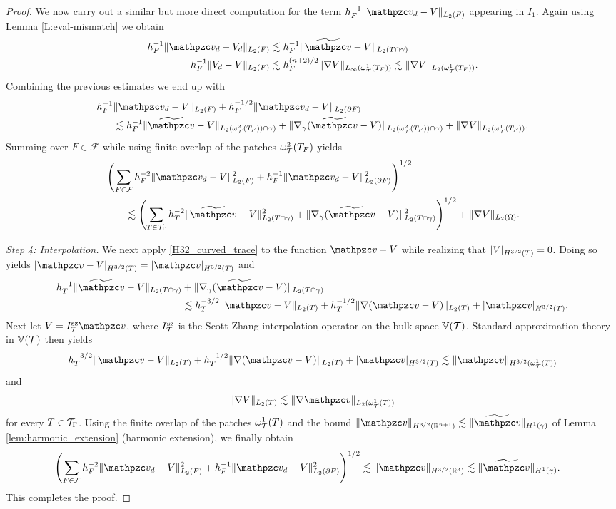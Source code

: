 \begin{proof}
We now carry out a similar but more direct computation for the term $h_F^{-1} \|\tv_d-\tV\|_{L_2(F)}$ appearing in $I_1$.   Again using Lemma \ref{L:eval-mismatch} we obtain
%
\begin{align*}
  h_F^{-1} \|\tv_d-\tV_d\|_{L_2(F)} &\lesssim h_F^{-1} \|\wv-V\|_{L_2(T\cap\gamma)}
  \\
  h_F^{-1} \|\tV_d-\tV\|_{L_2(F)} &
  \lesssim h_F^{(n+2)/2} \|\nabla V\|_{L_\infty(\omega_\T^1(T_F))}
  \lesssim \|\nabla V\|_{L_2(\omega_\T^1(T_F))}.
\end{align*}
%
Combining the previous estimates we end up with
%
\begin{align*}
 h_F^{-1}&  \|\tv_d-\tV\|_{L_2(F)}   + h_F^{-1/2} \|\tv_d-\tV\|_{L_2(\partial F)} 
 \\ &  \lesssim h_F^{-1} \|\wv-\tV\|_{L_2(\omega_\T^2(T_F)) \cap \gamma)} + \|\nabla_\gamma(\wv-\tV)\|_{L_2(\omega_\T^2(T_F)) \cap \gamma)} + \|\nabla \tV\|_{L_2(\omega_\T^1(T_F))}.
\end{align*}
%
Summing over $F \in \mathcal{F}$ while using finite overlap of the patches $\omega_{\mathcal{T}}^2(T_F)$ yields
%
\begin{align*} 
&  \left ( \sum_{F \in \mathcal{F}} h_F^{-2} \|\tv_d-\tV\|_{L_2(F)}^2  + h_F^{-1} \|\tv_d-\tV\|_{L_2(\partial F)}^2 \right )^{1/2} 
 \\ &  \qquad \lesssim \left ( \sum_{T \in \T_\Gamma} h_T^{-2} \|\wv -\tV\|_{L_2(T \cap \gamma)}^2 + \|\nabla_\gamma (\wv -\tV)\|_{L_2(T \cap \gamma)}^2 \right ) ^{1/2} + \|\nabla \tV\|_{L_2(\Omega)}.
 \end{align*} 

{\it Step 4: Interpolation.} 
We next apply \eqref{H32_curved_trace} to the function $\tv-\tV$ while realizing that $|V|_{H^{3/2}(T)}=0$.  Doing so yields $|\tv-\tV|_{H^{3/2}(T)}=|\tv|_{H^{3/2}(T)}$ and
$$ \begin{aligned}
h_T^{-1} \|\wv -\tV\|_{L_2(T \cap \gamma)} & + \|\nabla_\gamma (\wv -\tV)\|_{L_2(T \cap \gamma)}
 \\ &  \lesssim h_T^{-3/2} \|\tv-\tV\|_{L_2(T)} + h_T^{-1/2} \|\nabla (\tv-\tV)\|_{L_2(T)} + |\tv|_{H^{3/2}(T)}.
\end{aligned}
$$ 
Next let $\tV=I^{\textrm{sz}}_\T \tv$, where $I^{\textrm{sz}}_{\mathcal{T}}$ is the Scott-Zhang interpolation operator on the bulk space $\mathbb{V}(\mathcal T)$.  Standard approximation theory in  $\mathbb{V}(\mathcal T)$ then yields
%
$$ h_T^{-3/2} \|\tv-\tV\|_{L_2(T)} + h_T^{-1/2} \|\nabla (\tv-\tV)\|_{L_2(T)} + |\tv|_{H^{3/2}(T)} \lesssim \|\tv\|_{H^{3/2}(\omega_\T^1(T))}$$
%
and
%
$$\|\nabla \tV\|_{L_2(T)} \lesssim \|\nabla \tv\|_{L_2(\omega_\T^1(T))}$$
%
for every $T\in\mathcal{T}_\Gamma$.
Using the finite overlap of the patches $\omega_{\mathcal{T}}^1(T)$ and the bound
$\|\tv\|_{H^{3/2}(\mathbb{R}^{n+1})} \lesssim \|\wv\|_{H^1(\gamma)}$ of Lemma \ref{lem:harmonic_extension} (harmonic extension), we finally obtain
%
\begin{align*}
\left ( \sum_{F \in \mathcal{F}} h_F^{-2} \|\tv_d-\tV\|_{L_2(F)}^2  + h_F^{-1} \|\tv_d-\tV\|_{L_2(\partial F)}^2 \right )^{1/2} & \lesssim \|\tv\|_{H^{3/2}(\mathbb{R}^3)} \lesssim \|\wv\|_{H^1(\gamma)}.
\end{align*}
%
This completes the proof.
\end{proof}

